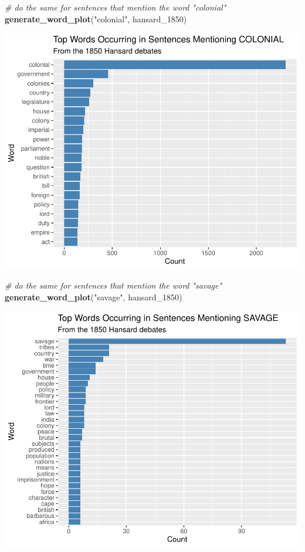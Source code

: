 \documentclass[
]{article}
\newenvironment{Shaded}{\begin{snugshade}}{\end{snugshade}}
\newcommand{\CommentTok}[1]{\textcolor[rgb]{0.56,0.35,0.01}{\textit{#1}}}
\newcommand{\FunctionTok}[1]{\textcolor[rgb]{0.13,0.29,0.53}{\textbf{#1}}}
\newcommand{\NormalTok}[1]{#1}
\newcommand{\StringTok}[1]{\textcolor[rgb]{0.31,0.60,0.02}{#1}}
\begin{document}
\begin{Shaded}
\begin{Highlighting}[]
\CommentTok{\# do the same for sentences that mention the word "colonial"}
\FunctionTok{generate\_word\_plot}\NormalTok{(}\StringTok{"colonial"}\NormalTok{, hansard\_1850)}
\end{Highlighting}
\end{Shaded}

\includegraphics[width=0.8\linewidth]{ch1-11.25.2024_files/figure-latex/unnamed-chunk-42-1}

\begin{Shaded}
\begin{Highlighting}[]
\CommentTok{\# do the same for sentences that mention the word "savage"}
\FunctionTok{generate\_word\_plot}\NormalTok{(}\StringTok{"savage"}\NormalTok{, hansard\_1850)}
\end{Highlighting}
\end{Shaded}

\includegraphics[width=0.8\linewidth]{ch1-11.25.2024_files/figure-latex/unnamed-chunk-43-1}
\end{document}
